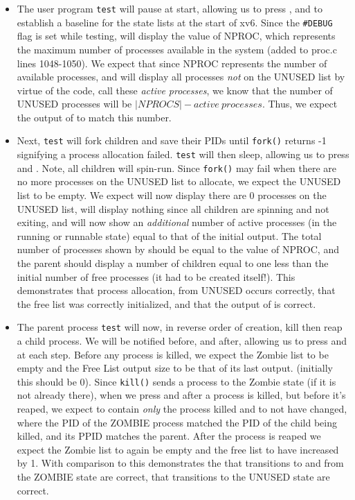 \documentclass[11pt,letterpaper]{report}
\begin{document}
	\begin{itemize}
		\item The user program {\tt test} will pause at start, allowing us to press ,  and  to establish a baseline for the state lists at the start of xv6. Since the {\tt \#DEBUG} flag is set while testing,  will display 
		the value of NPROC, which represents the maximum number of processes available in the system (added to proc.c lines 1048-1050). We expect that since NPROC represents the number of available processes, and  will display all 
		processes \emph{not} on the UNUSED list by virtue of the code, call these \emph{active processes}, we know that the number of UNUSED processes will be $|NPROCS| - active\  processes$. 
		Thus, we expect the output of  to match this number.
		
		\item Next, {\tt test} will fork children and save their PIDs until {\tt fork()} returns -1 signifying a process allocation failed. {\tt test} will then sleep, allowing us to press   and . Note, all children will spin-run. 
		Since {\tt fork()} may fail when there are no more processes on the UNUSED list to allocate, we expect the UNUSED list to be empty. We expect  will now display there are 0 processes on the UNUSED list, 
		 will display nothing since all children are spinning and not exiting, and  will now show an \emph{additional} number of active processes (in the running or runnable state) equal to that of the initial  output. 
		The total number of processes shown by  should be equal to the value of NPROC, and the parent should display a number of children equal to one less than the initial number of free processes (it had to be created itself!). 
		This demonstrates that process allocation, from UNUSED occurs correctly, that the free list was correctly initialized, and that the output of  is correct.  
				
		\item The parent process {\tt test} will now, in reverse order of creation, kill then reap a child process. We will be notified before, and after, allowing us to press  and  at each step. 
		Before any process is killed, we expect the Zombie list to be empty and the Free List output size to be that of its last output. (initially this should be 0). Since {\tt kill()} sends a process to the 
		Zombie state (if it is not already there), when we press  and  after a process is killed, but before it's reaped, we expect  to contain \emph{only} the process killed and  to not have changed, 
		where the PID of the ZOMBIE process matched the PID of the child being killed, and its PPID matches the parent. After the process is reaped we expect the Zombie list to again be empty and the free list to have 
		increased by 1. With comparison to  this demonstrates the that transitions to and from the ZOMBIE state are correct, that transitions to the UNUSED state are correct. 
		

\end{itemize}
\end{document}
